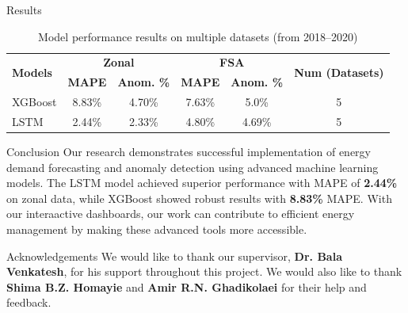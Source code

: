 \documentclass[final]{beamer}
\newlength{\colwidth}
\begin{document}
\begin{frame}[t]
\begin{columns}[t]
\begin{column}{\colwidth}
\begin{block}{Results}
    \begin{table}
      \centering
      \vspace{-0.5cm}
      \caption{Model performance results on multiple datasets (from 2018–2020)}
      \begin{tabular}{l cc cc c}
        \toprule
        \multirow{2}{*}{\textbf{Models}} & \multicolumn{2}{c}{\textbf{Zonal}} & \multicolumn{2}{c}{\textbf{FSA}} & \multirow{2}{*}{\textbf{Num (Datasets)}} \\
        & \textbf{MAPE} & \textbf{Anom. \%} & \textbf{MAPE} & \textbf{Anom. \%} & \\
        \midrule
        XGBoost & 8.83\% & 4.70\% & 7.63\% & 5.0\% & 5 \\
        LSTM & 2.44\% & 2.33\% & 4.80\% & 4.69\% & 5 \\
        \bottomrule
      \end{tabular}
    \end{table}
  
  \end{block}
  \vspace{-0.5cm}
  \begin{block}{Conclusion}
  Our research demonstrates successful implementation of energy demand forecasting and anomaly detection using advanced machine learning models. The LSTM model achieved superior performance with MAPE of \textbf{2.44\%} on zonal data, while XGBoost showed robust results with \textbf{8.83\%} MAPE. With our interaactive dashboards, our work can contribute to efficient energy management by making these advanced tools more accessible.

  \end{block}
  \vspace{-0.5cm}
  \begin{block}{Acknowledgements}
  We would like to thank our supervisor, \textbf{Dr. Bala Venkatesh}, for his support throughout this project. We would also like to thank \textbf{Shima B.Z. Homayie} and \textbf{Amir R.N. Ghadikolaei} for their help and feedback.
  \end{block}

\end{column}


\end{columns}
\end{frame}
\end{document}
